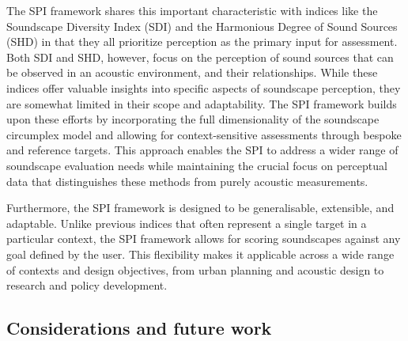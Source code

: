 \documentclass[
  authoryear,
  preprint,
  1p]{elsarticle}
\begin{document}
The SPI framework shares this important characteristic with indices like
the Soundscape Diversity Index (SDI) \citep{Liu2014Effects} and the
Harmonious Degree of Sound Sources (SHD) \citep{Guo2023Harmonious} in
that they all prioritize perception as the primary input for assessment.
Both SDI and SHD, however, focus on the perception of sound sources that
can be observed in an acoustic environment, and their relationships.
While these indices offer valuable insights into specific aspects of
soundscape perception, they are somewhat limited in their scope and
adaptability. The SPI framework builds upon these efforts by
incorporating the full dimensionality of the soundscape circumplex model
and allowing for context-sensitive assessments through bespoke and
reference targets. This approach enables the SPI to address a wider
range of soundscape evaluation needs while maintaining the crucial focus
on perceptual data that distinguishes these methods from purely acoustic
measurements.

Furthermore, the SPI framework is designed to be generalisable,
extensible, and adaptable. Unlike previous indices that often represent
a single target in a particular context, the SPI framework allows for
scoring soundscapes against any goal defined by the user. This
flexibility makes it applicable across a wide range of contexts and
design objectives, from urban planning and acoustic design to research
and policy development.

\subsection{Considerations and future work}\label{limitations}
\end{document}
